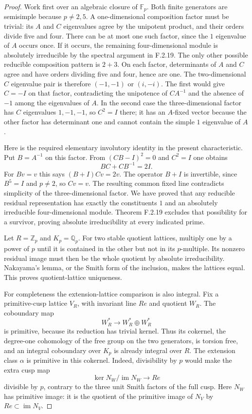 \begin{proof}
Work first over an algebraic closure of $\mathbb F_p$.
Both finite generators are semisimple because $p\ne2,5$.
A one-dimensional composition factor must be trivial:
its $A$ and $C$ eigenvalues agree by the unipotent product,
and their orders divide five and four.
There can be at most one such factor, since the $1$
eigenvalue of $A$ occurs once.
If it occurs, the remaining four-dimensional module is
absolutely irreducible by the spectral argument in F.2.19.
The only other possible reducible composition pattern is
$2+3$.
On each factor, determinants of $A$ and $C$ agree and
have orders dividing five and four, hence are one.
The two-dimensional $C$ eigenvalue pair is therefore
$(-1,-1)$ or $(i,-i)$.
The first would give $C=-I$ on that factor, contradicting
the unipotence of $CA^{-1}$ and the absence of $-1$
among the eigenvalues of $A$.
In the second case the three-dimensional factor has
$C$ eigenvalues $1,-1,-1$, so $C^2=I$ there; it has
an $A$-fixed vector because the other factor has determinant
one and cannot contain the simple $1$ eigenvalue of $A$.

Here is the required elementary involutory identity in the
present characteristic.  Put $B=A^{-1}$ on this factor.
From $(CB-I)^2=0$ and $C^2=I$ one obtains
\[
 BC+CB^{-1}=2I.
\]
For $Bv=v$ this says $(B+I)Cv=2v$.
The operator $B+I$ is invertible, since $B^5=I$ and
$p\ne2$, so $Cv=v$.  The resulting common fixed line
contradicts simplicity of the three-dimensional factor.
We have proved that any reducible residual representation
has exactly the constituents $1$ and an absolutely
irreducible four-dimensional module.  Theorem F.2.19
excludes that possibility for a survivor, proving absolute
irreducibility at every indicated prime.

Let $R=\mathbb Z_p$ and $K_p=\mathbb Q_p$.
For two stable quotient lattices, multiply one by a power
of $p$ until it is contained in the other but not in its
$p$-multiple.  Its nonzero residual image must then be the
whole quotient by absolute irreducibility.  Nakayama's
lemma, or the Smith form of the inclusion, makes the
lattices equal.  This proves quotient-lattice uniqueness.

For completeness the extension-lattice comparison is also
integral.  Fix a primitive-cusp lattice $V_R$, with invariant
line $Re$ and quotient $W_R$.
The coboundary map
\[
 W_R^*\longrightarrow W_R^*\oplus W_R^*
\]
is primitive, because its reduction has trivial kernel.
Thus its cokernel, the degree-one cohomology of the free
group on the two generators, is torsion free, and an
integral coboundary over $K_p$ is already integral over $R$.
The extension class $\alpha$ is primitive in this cokernel.
Indeed, divisibility by $p$ would make the extra cusp map
\[
 \ker N_W/\operatorname{im}N_W\longrightarrow Re
\]
divisible by $p$, contrary to the three unit Smith factors
of the full cusp.  Here $N_W$ has primitive image:
it is the quotient of the primitive image of $N_V$ by
$Re\subset\operatorname{im}N_V$.


\end{proof}
